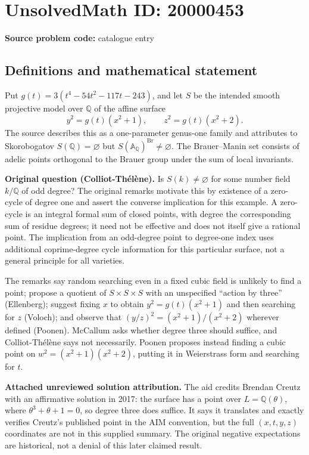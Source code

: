 \documentclass[11pt]{article}
\newcommand{\Q}{\mathbb{Q}}
\newcommand{\A}{\mathbb{A}}
\begin{document}
\section*{UnsolvedMath ID: 20000453}
\textbf{Source problem code:} catalogue entry
\subsection{Definitions and mathematical statement}
Put $g(t)=3(t^4-54t^2-117t-243)$, and let $S$ be the intended smooth projective model over $\Q$ of the affine surface
\[y^2=g(t)(x^2+1),\qquad z^2=g(t)(x^2+2).\]
The source describes this as a one-parameter genus-one family and attributes to Skorobogatov $S(\Q)=\varnothing$ but $S(\A_{\Q})^{\operatorname{Br}}\ne\varnothing$. The Brauer--Manin set consists of adelic points orthogonal to the Brauer group under the sum of local invariants.

\textbf{Original question (Colliot-Thélène).} Is $S(k)\ne\varnothing$ for some number field $k/\Q$ of odd degree? The original remarks motivate this by existence of a zero-cycle of degree one and assert the converse implication for this example. A zero-cycle is an integral formal sum of closed points, with degree the corresponding sum of residue degrees; it need not be effective and does not itself give a rational point. The implication from an odd-degree point to degree-one index uses additional coprime-degree cycle information for this particular surface, not a general principle for all varieties.

The remarks say random searching even in a fixed cubic field is unlikely to find a point; propose a quotient of $S\times S\times S$ with an unspecified ``action by three'' (Ellenberg); suggest fixing $x$ to obtain $y^2=g(t)(x^2+1)$ and then searching for $z$ (Voloch); and observe that $(y/z)^2=(x^2+1)/(x^2+2)$ wherever defined (Poonen). McCallum asks whether degree three should suffice, and Colliot-Thélène says not necessarily. Poonen proposes instead finding a cubic point on $w^2=(x^2+1)(x^2+2)$, putting it in Weierstrass form and searching for $t$.

\textbf{Attached unreviewed solution attribution.} The aid credits Brendan Creutz with an affirmative solution in 2017: the surface has a point over $L=\Q(\theta)$, where $\theta^3+\theta+1=0$, so degree three does suffice. It says it translates and exactly verifies Creutz's published point in the AIM convention, but the full $(x,t,y,z)$ coordinates are not in this supplied summary. The original negative expectations are historical, not a denial of this later claimed result.
\end{document}
